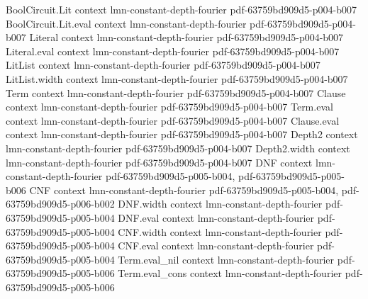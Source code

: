 \begin{lemma}
\label{LowDegreeTest.parseval_pm1}
\leanok
{}
\proofstep
  {BoolCircuit.Lit}
  {context}
  {lmn-constant-depth-fourier}
  {pdf-63759bd909d5-p004-b007}
\proofstep
  {BoolCircuit.Lit.eval}
  {context}
  {lmn-constant-depth-fourier}
  {pdf-63759bd909d5-p004-b007}
\proofstep
  {Literal}
  {context}
  {lmn-constant-depth-fourier}
  {pdf-63759bd909d5-p004-b007}
\proofstep
  {Literal.eval}
  {context}
  {lmn-constant-depth-fourier}
  {pdf-63759bd909d5-p004-b007}
\proofstep
  {LitList}
  {context}
  {lmn-constant-depth-fourier}
  {pdf-63759bd909d5-p004-b007}
\proofstep
  {LitList.width}
  {context}
  {lmn-constant-depth-fourier}
  {pdf-63759bd909d5-p004-b007}
\proofstep
  {Term}
  {context}
  {lmn-constant-depth-fourier}
  {pdf-63759bd909d5-p004-b007}
\proofstep
  {Clause}
  {context}
  {lmn-constant-depth-fourier}
  {pdf-63759bd909d5-p004-b007}
\proofstep
  {Term.eval}
  {context}
  {lmn-constant-depth-fourier}
  {pdf-63759bd909d5-p004-b007}
\proofstep
  {Clause.eval}
  {context}
  {lmn-constant-depth-fourier}
  {pdf-63759bd909d5-p004-b007}
\proofstep
  {Depth2}
  {context}
  {lmn-constant-depth-fourier}
  {pdf-63759bd909d5-p004-b007}
\proofstep
  {Depth2.width}
  {context}
  {lmn-constant-depth-fourier}
  {pdf-63759bd909d5-p004-b007}
\proofstep
  {DNF}
  {context}
  {lmn-constant-depth-fourier}
  {pdf-63759bd909d5-p005-b004,
    pdf-63759bd909d5-p005-b006}
\proofstep
  {CNF}
  {context}
  {lmn-constant-depth-fourier}
  {pdf-63759bd909d5-p005-b004,
    pdf-63759bd909d5-p006-b002}
\proofstep
  {DNF.width}
  {context}
  {lmn-constant-depth-fourier}
  {pdf-63759bd909d5-p005-b004}
\proofstep
  {DNF.eval}
  {context}
  {lmn-constant-depth-fourier}
  {pdf-63759bd909d5-p005-b004}
\proofstep
  {CNF.width}
  {context}
  {lmn-constant-depth-fourier}
  {pdf-63759bd909d5-p005-b004}
\proofstep
  {CNF.eval}
  {context}
  {lmn-constant-depth-fourier}
  {pdf-63759bd909d5-p005-b004}
\proofstep
  {Term.eval_nil}
  {context}
  {lmn-constant-depth-fourier}
  {pdf-63759bd909d5-p005-b006}
\proofstep
  {Term.eval_cons}
  {context}
  {lmn-constant-depth-fourier}
  {pdf-63759bd909d5-p005-b006}

\end{lemma}
